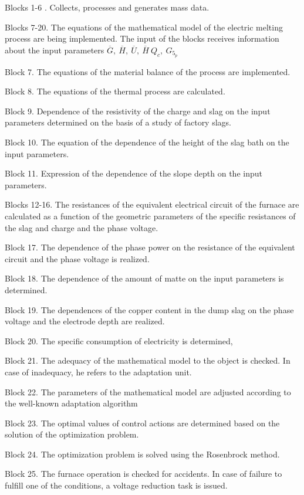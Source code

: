 Blocks 1-6 . Collects, processes and generates mass data.

Blocks 7-20. The equations of the mathematical model of the electric
melting process are being implemented. The input of the blocks receives
information about the input parameters
\(\overline{G},\ \overline{H},\ \overline{U},\ \overline{H}\ Q_{c},\ G_{5_{p}}\)

Block 7. The equations of the material balance of the process are
implemented.

Block 8. The equations of the thermal process are calculated.

Block 9. Dependence of the resistivity of the charge and slag on the
input parameters determined on the basis of a study of factory slags.

Block 10. The equation of the dependence of the height of the slag bath
on the input parameters.

Block 11. Expression of the dependence of the slope depth on the input
parameters.

Blocks 12-16. The resistances of the equivalent electrical circuit of
the furnace are calculated as a function of the geometric parameters of
the specific resistances of the slag and charge and the phase voltage.

Block 17. The dependence of the phase power on the resistance of the
equivalent circuit and the phase voltage is realized.

Block 18. The dependence of the amount of matte on the input parameters
is determined.

Block 19. The dependences of the copper content in the dump slag on the
phase voltage and the electrode depth are realized.

Block 20. The specific consumption of electricity is determined,

Block 21. The adequacy of the mathematical model to the object is
checked. In case of inadequacy, he refers to the adaptation unit.

Block 22. The parameters of the mathematical model are adjusted
according to the well-known adaptation algorithm

Block 23. The optimal values of control actions are determined based on
the solution of the optimization problem.

Block 24. The optimization problem is solved using the Rosenbrock
method.

Block 25. The furnace operation is checked for accidents. In case of
failure to fulfill one of the conditions, a voltage reduction task is
issued.

